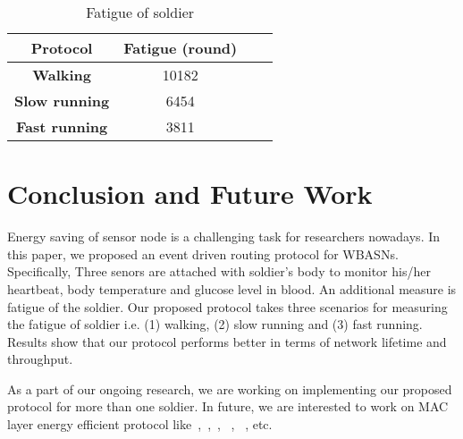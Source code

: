 \documentclass[journal]{IEEEtran}
\begin{document}
\begin{table}[!ht]
\begin{center}
\caption{Fatigue of soldier}
  \begin{tabular}{|c|c|c|c|}\hline
   \textbf{Protocol}            & \textbf{Fatigue (round)}       \\ \hline \hline
    \textbf{Walking }           & 10182                           \\ \hline
     \textbf{Slow running}      & 6454                             \\ \hline
      \textbf{Fast running}     & 3811                              \\ \hline
\end{tabular}
\end{center}
\end{table}

\vspace{-1cm}
\section{Conclusion and Future Work}
Energy saving of sensor node is a challenging task for researchers nowadays. In this paper, we proposed an event driven routing protocol for WBASNs. Specifically,
Three senors are attached with soldier's body to monitor his/her heartbeat, body temperature and glucose level in blood. An additional measure is fatigue of the
soldier. Our
 proposed protocol takes three scenarios for measuring the fatigue of soldier i.e. (1) walking, (2) slow running and (3) fast running. Results show that our
  protocol performs better in terms of network lifetime and throughput.

As a part of our ongoing research, we are working on implementing our proposed protocol for more than one soldier. In future,
we are interested to work on MAC layer energy efficient protocol like~\cite{17},~\cite{18},~\cite{19}, ~\cite{20}, ~\cite{21}, etc.
\end{document}
